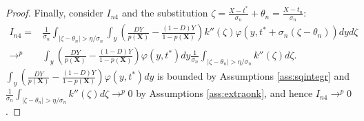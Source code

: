 {\begin{proof}
        Finally, consider $I_{n4}$ and the substitution $\zeta = \frac{X - t^*}{\sigma_n} + \theta_n = \frac{X - t_n}{\sigma_n}$:
        \begin{align}
            I_{n4} =& \frac{1}{\sigma_n} \int_{|\zeta - \theta_n| > \eta/\sigma_n} \int_y \left(\frac{D Y}{p(\textbf{X})} - \frac{(1-D) Y}{1-p(\textbf{X})} \right) k''\left(\zeta \right) \varphi(y,t^* + \sigma_n(\zeta - \theta_n)) dy d\zeta \\
            \rightarrow^p& \int_y \left(\frac{D Y}{p(\textbf{X})} - \frac{(1-D) Y}{1-p(\textbf{X})} \right) \varphi(y,t^* ) dy \frac{1}{\sigma_n} \int_{|\zeta - \theta_n| > \eta/\sigma_n} k''\left(\zeta \right) d\zeta.
        \end{align}
        $\int_y \left(\frac{D Y}{p(\textbf{X})} - \frac{(1-D) Y}{1-p(\textbf{X})} \right) \varphi(y,t^* ) dy$ is bounded by Assumptions \ref{ass:sqintegr} and $\frac{1}{\sigma_n} \int_{|\zeta - \theta_n| > \eta/\sigma_n} k''\left(\zeta \right) d\zeta \rightarrow^p 0$ by Assumptions \ref{ass:extraonk}, and hence $I_{n4} \rightarrow^p 0$.


\end{proof}}
